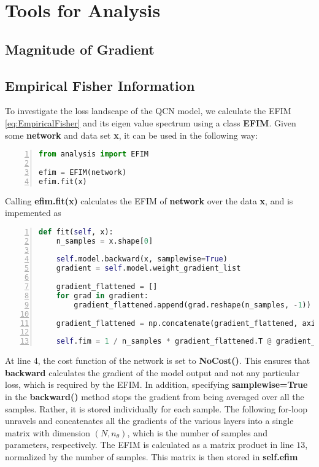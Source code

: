 \section{Tools for Analysis}\label{sec:Tools for Analysis Imp}

\subsection{Magnitude of Gradient}\label{sec:Gradient Magnitude}



\subsection{Empirical Fisher Information}\label{sec:FIMImplement}
To investigate the loss landscape of the QCN model, we calculate the EFIM \autoref{eq:EmpiricalFisher} and its eigen value spectrum using a class \textbf{EFIM}. Given some \textbf{network} and data set \textbf{x}, it can be used in the following way:
\begin{lstlisting}[language=python, numbers=left]
from analysis import EFIM

efim = EFIM(network)
efim.fit(x)
\end{lstlisting}
Calling \textbf{efim.fit(x)} calculates the EFIM of \textbf{network} over the data \textbf{x}, and is impemented as
\begin{lstlisting}[language=python, numbers=left]
def fit(self, x):
    n_samples = x.shape[0]

    self.model.backward(x, samplewise=True)
    gradient = self.model.weight_gradient_list

    gradient_flattened = []
    for grad in gradient:
        gradient_flattened.append(grad.reshape(n_samples, -1))

    gradient_flattened = np.concatenate(gradient_flattened, axis=1)

    self.fim = 1 / n_samples * gradient_flattened.T @ gradient_flattened
\end{lstlisting}
At line 4, the cost function of the network is set to \textbf{NoCost()}. This ensures that \textbf{backward} calculates the gradient of the model output and not any particular loss, which is required by the EFIM. In addition, specifying \textbf{samplewise=True} in the \textbf{backward()} method stops the gradient from being averaged over all the samples. Rather, it is stored individually for each sample. The following for-loop unravels and concatenates all the gradients of the various layers into a single matrix with dimension $(N, n_{\theta})$, which is the number of samples and parameters, respectively. The EFIM is calculated as a matrix product in line $13$, normalized by the number of samples. This matrix is then stored in \textbf{self.efim}

